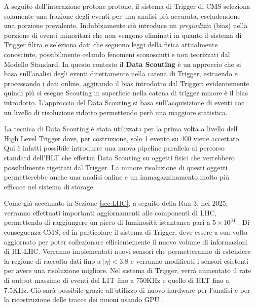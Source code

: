 A seguito dell'interazione protone protone, il sistema di Trigger di CMS seleziona solamente una frazione degli eventi per una analisi più accurata, escludendone una porzione prevalente. Indubbiamente ciò introduce un \textit{pregiudizio} (bias) nella porzione di eventi minoritari che non vengono eliminati in quanto il sistema di Trigger filtra e seleziona dati che seguono leggi della fisica attualmente conosciute, possibilmente celando fenomeni sconosciuti e non teorizzati dal Modello Standard. \newline
In questo contesto il \textbf{ Data Scouting} è un approccio che si basa sull'analisi degli eventi direttamente nella catena di Trigger, estraendo e processando i dati online, aggirando il bias introdotto dal Trigger: evidentemente quindi più si esegue Scouting in superficie nella catena di trigger minore è il bias introdotto. L'approccio del Data Scouting si basa sull'acquisizione di eventi con un livello di risoluzione ridotto permettendo però una maggiore statistica.

La tecnica di Data Scouting è stata utilizzata per la prima volta a livello dell High Level Trigger dove, per costruzione, solo 1 evento su 400 viene accettato. Qui è infatti possibile introdurre una nuova pipeline parallela al percorso standard dell'HLT che effettui Data Scouting su oggetti fisici che verrebbero possibilmente rigettati dal Trigger. La minore risoluzione di questi oggetti permetterebbe anche una analisi online e un immagazzinamento molto più efficace nel sistema di storage. 

Come già accennato in Sezione \ref{sec:LHC}, a seguito della Run 3, nel 2025, verranno effettuati importanti aggiornamenti alle componenti di LHC, permettendo di raggiungere un picco di luminosità istantanea pari a $5 \times 10^{34}$ \Lumi. Di conseguenza CMS, ed in particolare il sistema di Trigger, deve essere a sua volta aggiornato per poter collezionare efficientemente il nuovo volume di informazioni di HL-LHC. Verranno implementati nuovi sensori che permetteranno di estendere la regione di raccolta dati fino a $|\eta| < 3.8$ e verranno modificati i sensori esistenti per avere una risoluzione migliore. Nel sistema di Trigger, verrà aumentato il rate di output massimo di eventi del L1T fino a 750KHz e quello di HLT fino a 7.5KHz. Ciò sarà possibile grazie all'utilizzo di nuovo hardware per l'analisi e per la ricostruzione delle tracce dei muoni usando GPU \cite{collaboration2021phase}.


